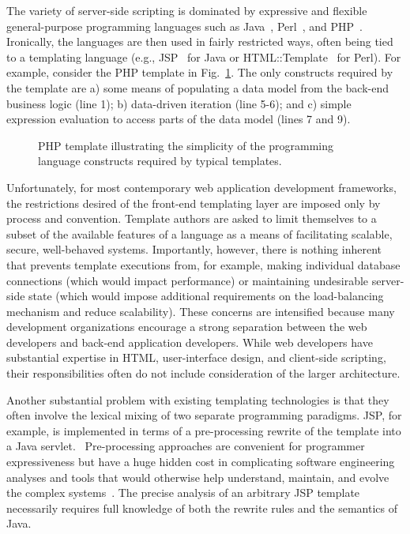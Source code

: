 \documentclass{www2003-submission}
\newcommand{\figref}[1]{Fig.~\ref{fig-#1}}
\begin{document}
The variety of server-side scripting is dominated by expressive and
flexible general-purpose programming languages such as
Java~\cite{Java}, Perl~\cite{Perl}, and PHP~\cite{PHP}.  Ironically,
the languages are then used in fairly restricted ways, often being
tied to a templating language (e.g., JSP~\cite{JSP} for Java or
HTML::Template~\cite{HTML-Template} for Perl).  For example, consider
the PHP template in \figref{php-books}.  The only constructs required
by the template are a) some means of populating a data model from the
back-end business logic (line 1); b) data-driven iteration (line
5-6); and c) simple expression evaluation to access parts of the data
model (lines 7 and 9). %

\begin{figure}[htbp]
\caption{PHP template illustrating the simplicity of the programming
language constructs required by typical templates.
\label{fig-php-books}}
\end{figure}

Unfortunately, for most contemporary web application development
frameworks, the restrictions desired of the front-end templating layer
are imposed only by process and convention.  Template authors are
asked to limit themselves to a subset of the available features of a
language as a means of facilitating scalable, secure, well-behaved
systems.  Importantly, however, there is nothing inherent that
prevents template executions from, for example, making individual
database connections (which would impact performance) or maintaining
undesirable server-side state (which would impose additional
requirements on the load-balancing mechanism and reduce scalability).
These concerns are intensified because many development organizations
encourage a strong separation between the web developers and back-end
application developers. While web developers have substantial
expertise in HTML, user-interface design, and client-side scripting,
their responsibilities often do not include consideration of the
larger architecture.

Another substantial problem with existing templating technologies is
that they often involve the lexical mixing of two separate programming
paradigms.  JSP, for example, is implemented in terms of a
pre-processing rewrite of the template into a Java servlet.~\cite{JaveServlet}
Pre-processing approaches are convenient for programmer expressiveness
but have a huge hidden cost in complicating software engineering
analyses and tools that would otherwise help understand, maintain, and
evolve the complex systems~\cite{PCP3,EvilMacros,StroustropDnEChapterAboutCpp}.
The precise analysis of an arbitrary JSP template necessarily requires
full knowledge of both the rewrite rules and the semantics of Java.
\end{document}
